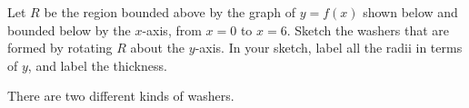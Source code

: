 \begin{question}
Let $R$ be the region bounded above by the graph of $y=f(x)$ shown below and bounded below by the $x$-axis, from $x=0$ to $x=6$. Sketch the washers that are formed by rotating $R$ about the $y$-axis.
In your sketch, label all the radii in terms of $y$, and label the thickness.
\begin{center}
\end{center}

\end{question}
\begin{hint}
There are two different kinds of washers.
\end{hint}
